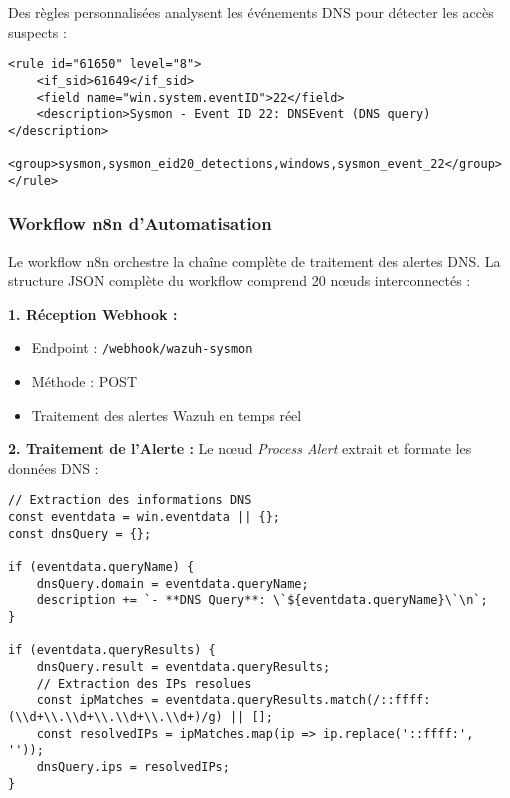 Des règles personnalisées analysent les événements DNS pour détecter les accès suspects :

\begin{lstlisting}[style=XMLStyle, caption=Règle Wazuh DNS, label=lst:wazuh-rule-dns]
<rule id="61650" level="8">
    <if_sid>61649</if_sid>
    <field name="win.system.eventID">22</field>
    <description>Sysmon - Event ID 22: DNSEvent (DNS query)</description>
    <group>sysmon,sysmon_eid20_detections,windows,sysmon_event_22</group>
</rule>
\end{lstlisting}

\subsubsection{Workflow n8n d'Automatisation}

Le workflow n8n orchestre la chaîne complète de traitement des alertes DNS. La structure JSON complète du workflow comprend 20 nœuds interconnectés :

\textbf{1. Réception Webhook :}
\begin{itemize}
    \item Endpoint : \texttt{/webhook/wazuh-sysmon}
    \item Méthode : POST
    \item Traitement des alertes Wazuh en temps réel
\end{itemize}

\textbf{2. Traitement de l'Alerte :}
Le nœud \textit{Process Alert} extrait et formate les données DNS :

\begin{lstlisting}[style=JSStyle, caption=Extraction données DNS, label=lst:dns-extract]
// Extraction des informations DNS
const eventdata = win.eventdata || {};
const dnsQuery = {};

if (eventdata.queryName) {
    dnsQuery.domain = eventdata.queryName;
    description += `- **DNS Query**: \`${eventdata.queryName}\`\n`;
}

if (eventdata.queryResults) {
    dnsQuery.result = eventdata.queryResults;
    // Extraction des IPs resolues
    const ipMatches = eventdata.queryResults.match(/::ffff:(\\d+\\.\\d+\\.\\d+\\.\\d+)/g) || [];
    const resolvedIPs = ipMatches.map(ip => ip.replace('::ffff:', ''));
    dnsQuery.ips = resolvedIPs;
}
\end{lstlisting}

